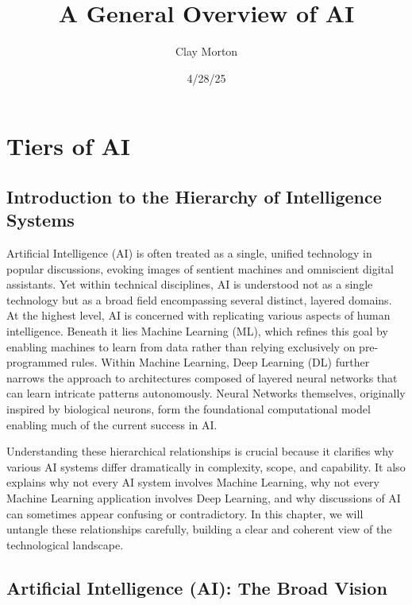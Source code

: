 \documentclass[openany]{book}
\title{A General Overview of AI}
\author{Clay Morton}
\date{4/28/25}
\begin{document}
\maketitle

\begingroup
\let\cleardoublepage\relax
\tableofcontents
\endgroup

\chapter{Tiers of AI}

\section{Introduction to the Hierarchy of Intelligence Systems}

Artificial Intelligence (AI) is often treated as a single, unified technology in
popular discussions, evoking images of sentient machines and omniscient digital 
assistants. Yet within technical disciplines, AI is understood not as a single 
technology but as a broad field encompassing several distinct, layered domains. 
At the highest level, AI is concerned with replicating various aspects of human 
intelligence. Beneath it lies Machine Learning (ML), which refines this goal by 
enabling machines to learn from data rather than relying exclusively on 
pre-programmed rules. Within Machine Learning, Deep Learning (DL) further 
narrows the approach to architectures composed of layered neural networks that 
can learn intricate patterns autonomously. Neural Networks themselves, 
originally inspired by biological neurons, form the foundational computational 
model enabling much of the current success in AI.

Understanding these hierarchical relationships is crucial because it clarifies 
why various AI systems differ dramatically in complexity, scope, and capability.
It also explains why not every AI system involves Machine Learning, why not 
every Machine Learning application involves Deep Learning, and why discussions 
of AI can sometimes appear confusing or contradictory. In this chapter, we will 
untangle these relationships carefully, building a clear and coherent view of 
the technological landscape.

\section{Artificial Intelligence (AI): The Broad Vision}
\end{document}
